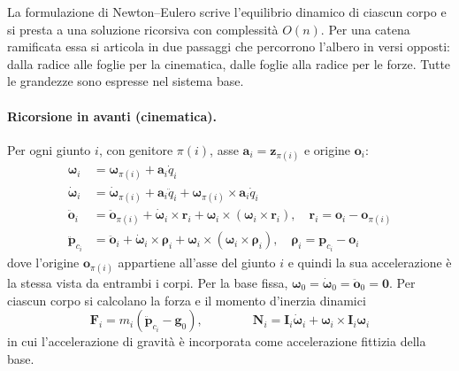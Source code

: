 La formulazione di Newton--Eulero scrive l'equilibrio dinamico di ciascun corpo e si presta a una soluzione ricorsiva con complessità $O(n)$. 
Per una catena ramificata essa si articola in due passaggi che percorrono l'albero in versi opposti: dalla radice alle foglie per la cinematica, dalle foglie alla radice per le forze. 
Tutte le grandezze sono espresse nel sistema base.

\paragraph{Ricorsione in avanti (cinematica).} Per ogni giunto $i$, con genitore $\pi(i)$, asse $\boldsymbol a_i=\boldsymbol z_{\pi(i)}$ e origine $\boldsymbol o_i$:
\begin{align}
    \boldsymbol\omega_i&=\boldsymbol\omega_{\pi(i)}+\boldsymbol a_i\dot q_i\\
    \dot{\boldsymbol\omega}_i&=\dot{\boldsymbol\omega}_{\pi(i)}+\boldsymbol a_i\ddot q_i+\boldsymbol\omega_{\pi(i)}\times\boldsymbol a_i\dot q_i\\
    \ddot{\boldsymbol o}_i&=\ddot{\boldsymbol o}_{\pi(i)}+\dot{\boldsymbol\omega}_i\times\boldsymbol r_i+\boldsymbol\omega_i\times(\boldsymbol\omega_i\times\boldsymbol r_i),\quad \boldsymbol r_i=\boldsymbol o_i-\boldsymbol o_{\pi(i)}\\
    \ddot{\boldsymbol p}_{c_i}&=\ddot{\boldsymbol o}_i+\dot{\boldsymbol\omega}_i\times\boldsymbol\rho_i+\boldsymbol\omega_i\times(\boldsymbol\omega_i\times\boldsymbol\rho_i),\quad \boldsymbol\rho_i=\boldsymbol p_{c_i}-\boldsymbol o_i
\end{align}
dove l'origine $\boldsymbol o_{\pi(i)}$ appartiene all'asse del giunto $i$ e quindi la sua accelerazione è la stessa vista da entrambi i corpi. Per la base fissa, $\boldsymbol\omega_0=\dot{\boldsymbol\omega}_0=\ddot{\boldsymbol o}_0=\boldsymbol 0$. Per ciascun corpo si calcolano la forza e il momento d'inerzia dinamici
\begin{equation}
    \boldsymbol F_i=m_i\left(\ddot{\boldsymbol p}_{c_i}-\boldsymbol g_0\right),
    \qquad \qquad
    \boldsymbol N_i=\boldsymbol I_i\dot{\boldsymbol\omega}_i+\boldsymbol\omega_i\times\boldsymbol I_i\boldsymbol\omega_i
\end{equation}
in cui l'accelerazione di gravità è incorporata come accelerazione fittizia della base.

